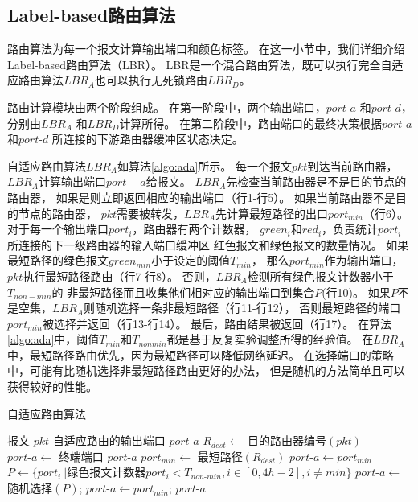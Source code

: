 \subsection{Label-based路由算法}

路由算法为每一个报文计算输出端口和颜色标签。
在这一小节中，我们详细介绍Label-based路由算法（LBR）。
LBR是一个混合路由算法，既可以执行完全自适应路由算法$LBR_A$也可以执行无死锁路由$LBR_D$。

路由计算模块由两个阶段组成。
在第一阶段中，两个输出端口，$port\textrm{-}a$ 和$port\textrm{-}d$，
分别由$LBR_A$ 和$LBR_D$计算所得。
在第二阶段中，路由端口的最终决策根据$port\textrm{-}a$和$port\textrm{-}d$
所连接的下游路由器缓冲区状态决定。

自适应路由算法$LBR_A$如算法\ref{algo:ada}所示。
每一个报文$pkt$到达当前路由器，$LBR_A$计算输出端口$port-a$给报文。
$LBR_A$先检查当前路由器是不是目的节点的路由器，
如果是则立即返回相应的输出端口（行1-行5）。
如果当前路由器不是目的节点的路由器，
$pkt$需要被转发，$LBR_A$先计算最短路径的出口$port_{min}$（行6）。
对于每一个输出端口$port_i$，路由器有两个计数器，
$green_i$和$red_i$，负责统计$port_i$所连接的下一级路由器的输入端口缓冲区
红色报文和绿色报文的数量情况。
如果最短路径的绿色报文$green_{min}$小于设定的阈值$T_{min}$，
那么$port_{min}$作为输出端口，$pkt$执行最短路径路由（行7-行8）。
否则，$LBR_A$检测所有绿色报文计数器小于$T_{non-min}$的
非最短路径而且收集他们相对应的输出端口到集合$P$(行10)。
如果$P$不是空集，$LBR_A$则随机选择一条非最短路径（行11-行12），
否则最短路径的端口$port_{min}$被选择并返回（行13-行14）。
最后，路由结果被返回（行17）。
在算法\ref{algo:ada}中，阈值$T_{min}$和$T_{nonmin}$都是基于反复实验调整所得的经验值。
在$LBR_A$中，最短路径路由优先，因为最短路径可以降低网络延迟。
在选择端口的策略中，可能有比随机选择非最短路径路由更好的办法，
但是随机的方法简单且可以获得较好的性能。

\begin{algorithm}[t]
  \centering
  \caption{自适应路由算法}
  \label{algo:ada}
  \begin{algorithmic}[1]
    \REQUIRE 报文 $pkt$
    \ENSURE 自适应路由的输出端口 $port\textrm{-}a$
    \STATE $R_{dest} \leftarrow$ 目的路由器编号$(pkt)$
    \STATE $port\textrm{-}a \leftarrow$ 终端端口
    \RETURN $port\textrm{-}a$
    \ENDIF
    \STATE $port_{min} \leftarrow$ 最短路径$(R_{dest})$
    \STATE $port\textrm{-}a \leftarrow port_{min}$
    \ELSE
    \STATE $P \leftarrow \{port_i\ |$绿色报文计数器${port_i} < T_{non\textrm{-}min}, i \in [0,4h-2], i \neq min\}$\hspace{-1em}
    \STATE $port\textrm{-}a \leftarrow$ 随机选择$(P)$;
    \ELSE
    \STATE $port\textrm{-}a \leftarrow port_{min}$;
    \ENDIF
    \ENDIF
    \RETURN $port\textrm{-}a$
  \end{algorithmic}
\end{algorithm}

